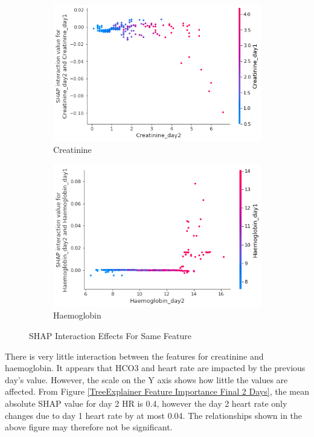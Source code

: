 \documentclass[12pt]{article}
\begin{document}
\begin{figure}[H]
\begin{subfigure}[b]{0.47\textwidth}
         \includegraphics[width=\linewidth]{TreeExplainer Final2/TreeExplainer Final2 Interaction Creatinine_day2 day 2.png}
         \caption{Creatinine}
     \end{subfigure}
     \hfill
     \begin{subfigure}[b]{0.47\textwidth}
         \centering
         \includegraphics[width=\linewidth]{TreeExplainer Final2/TreeExplainer Final2 Interaction Haemoglobin_day2 day 2.png}
         \caption{Haemoglobin}
     \end{subfigure}
     \caption{SHAP Interaction Effects For Same Feature}
        \label{Vanilla SHAP Global Features final 2}
\end{figure}

There is very little interaction between the features for creatinine and haemoglobin. It appears that HCO3 and heart rate are impacted by the previous day's value. However, the scale on the Y axis shows how little the values are affected. From Figure \ref{TreeExplainer Feature Importance Final 2 Days}, the mean absolute SHAP value for day 2 HR is 0.4, however the day 2 heart rate only changes due to day 1 heart rate by at most 0.04. The relationships shown in the above figure may therefore not be significant.
\end{document}
